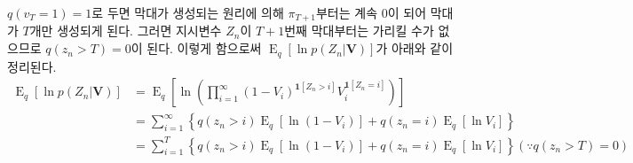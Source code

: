 \documentclass{article}
\begin{document}
\noindent $q(v_T=1)=1$로 두면 막대가 생성되는 원리에 의해 $\pi_{T+1}$부터는 계속 0이 되어 막대가 $T$개만 생성되게 된다. 
그러면 지시변수 $Z_n$이 $T+1$번째 막대부터는 가리킬 수가 없으므로 $q(z_n>T)=0$이 된다.
이렇게 함으로써 $\operatorname{E}_q[\ln p(Z_n|\textbf{V})]$가 아래와 같이 정리된다.
\begin{align*}
    \operatorname{E}_q[\ln p(Z_n|\textbf{V})]&=\operatorname{E}_q\left[\ln\left(\prod_{i=1}^\infty(1-V_i)^{\textbf{1}[Z_n>i]}V_i^{\textbf{1}[Z_n=i]}\right)\right]\\
    &=\sum_{i=1}^\infty \left\{q(z_n>i)\operatorname{E}_q[\ln(1-V_i)]+q(z_n=i)\operatorname{E}_q[\ln V_i]\right\}\\
    &=\sum_{i=1}^T \left\{q(z_n>i)\operatorname{E}_q[\ln(1-V_i)]+q(z_n=i)\operatorname{E}_q[\ln V_i]\right\}(\because q(z_n>T)=0)
\end{align*}

\newpage

\end{document}
